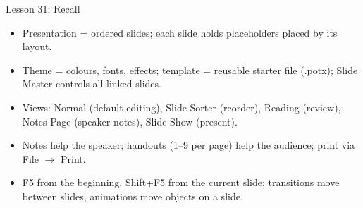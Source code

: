 \documentclass[aspectratio=169]{beamer}
\begin{document}
\begin{frame}{Lesson 31: Recall}
  \begin{itemize}
    \item Presentation = ordered slides; each slide holds placeholders placed
      by its layout.
    \item Theme = colours, fonts, effects; template = reusable starter file
      (.potx); Slide Master controls all linked slides.
    \item Views: Normal (default editing), Slide Sorter (reorder), Reading
      (review), Notes Page (speaker notes), Slide Show (present).
    \item Notes help the speaker; handouts (1--9 per page) help the audience;
      print via File $\rightarrow$ Print.
    \item F5 from the beginning, Shift+F5 from the current slide; transitions
      move between slides, animations move objects on a slide.
  \end{itemize}
\end{frame}
\end{document}
